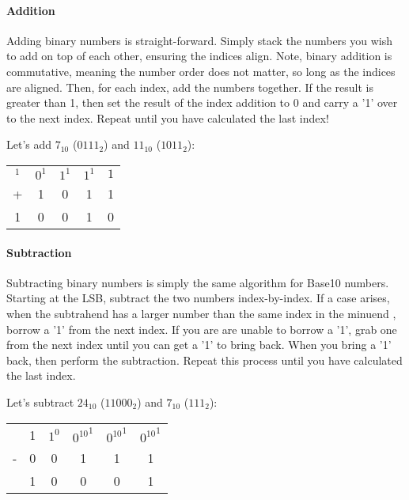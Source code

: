     \paragraph*{Addition} Adding binary numbers is straight-forward.
    Simply stack the numbers you wish to add on top of each other, ensuring the indices align.
    Note, binary addition is commutative, meaning the number order does not matter, so long as the indices are aligned.
    Then, for each index, add the numbers together.
    If the result is greater than 1, then set the result of the index addition to 0 and carry a '1' over to the next index.
    Repeat until you have calculated the last index!

    \begin{example}
        Let's add $7_{10}$ ($0111_2$) and $11_{10}$ ($1011_2$):
        \begin{center}
            \begin{tabular}{ccccc}
                $^1$  & $0^1$ & $1^1$ & $1^1$ & $1$ \\
                +     & 1     & 0     & 1     & 1 \\
                \hline
                1     & 0     & 0     & 1     & 0 \\
            \end{tabular}
        \end{center}
    \end{example}

    \paragraph*{Subtraction} Subtracting binary numbers is simply the same algorithm for Base10 numbers.
    Starting at the LSB, subtract the two numbers index-by-index.
    If a case arises, when the subtrahend  has a larger number than the same index in the minuend , borrow a '1' from the next index.
    If you are are unable to borrow a '1', grab one from the next index until you can get a '1' to bring back.
    When you bring a '1' back, then perform the subtraction.
    Repeat this process until you have calculated the last index.
    
    \begin{example}
        Let's subtract $24_{10}$ ($11000_2$) and $7_{10}$ ($111_2$):
        \begin{center}
            \begin{tabular}{cccccc}
                  & 1 & $1^0$ & ${0^{10}}^1$ & ${0^{10}}^1$ & ${0^{10}}^1$  \\
                - & 0 & 0     & 1            & 1            & 1             \\
                \hline
                  & 1 & 0     & 0            & 0            & 1             \\
            \end{tabular}
        \end{center}
    \end{example}

